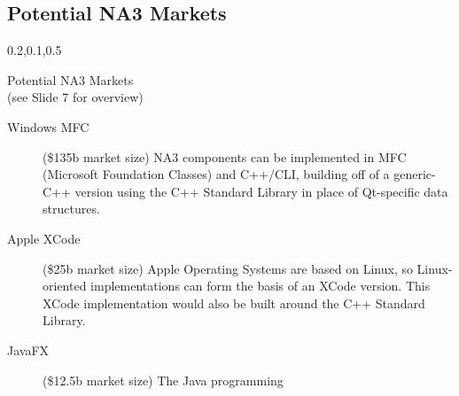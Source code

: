
\begin{frame}{}
\section{Potential NA3 Markets}

\vspace{-3.5em}	


	
{\Large{}\selectfont
\vspace{1em}
\begin{center}
\begin{minipage}{\textwidth}
\vspace{1em}
{\begin{minipage}{\textwidth}%
\begin{lightquadblockc}{0.2,0.1,0.5}{\parbox{21cm}{\vspace*{10pt}\centering Potential NA3 Markets \\(see Slide 7 for overview)\vspace*{10pt}}}
\hspace{10pt}\begin{minipage}{1.08\textwidth}
{\LARGE {}\selectfont \setlength{\leftmargini}{3pt}\begin{description}
\item[Windows MFC] ({\texttildelow}\$135b market size) NA3 components can be implemented 
in MFC (Microsoft Foundation Classes) and C++/CLI, building off of a generic-C++ version using 
the C++ Standard Library in place of Qt-specific data structures.\vspace{10pt} 	
\item[Apple XCode] ({\texttildelow}\$25b market size) Apple Operating Systems 
are based on Linux, so Linux-oriented \AtR{}  implementations can 
form the basis of an XCode version.  This XCode implementation 
would also be built around the C++ Standard Library. \vspace{10pt}
\item[JavaFX] ({\texttildelow}\$12.5b market size)  The Java programming 

\end{description}}
\end{minipage}
\end{lightquadblockc}
\end{minipage}}
\end{minipage}
\end{center}}
\end{frame}
